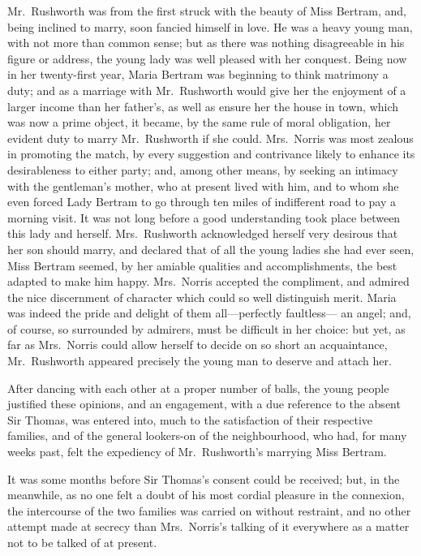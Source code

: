 Mr.\ Rushworth was from the first struck with the beauty
of Miss Bertram, and, being inclined to marry, soon fancied
himself in love.  He was a heavy young man, with not more
than common sense; but as there was nothing disagreeable
in his figure or address, the young lady was well pleased
with her conquest.  Being now in her twenty-first year,
Maria Bertram was beginning to think matrimony a duty;
and as a marriage with Mr.\ Rushworth would give her the
enjoyment of a larger income than her father's, as well as
ensure her the house in town, which was now a prime object,
it became, by the same rule of moral obligation,
her evident duty to marry Mr.\ Rushworth if she could.
Mrs.\ Norris was most zealous in promoting the match,
by every suggestion and contrivance likely to enhance
its desirableness to either party; and, among other means,
by seeking an intimacy with the gentleman's mother,
who at present lived with him, and to whom she even forced
Lady Bertram to go through ten miles of indifferent road
to pay a morning visit.  It was not long before a good
understanding took place between this lady and herself.
Mrs.\ Rushworth acknowledged herself very desirous that
her son should marry, and declared that of all the young
ladies she had ever seen, Miss Bertram seemed, by her
amiable qualities and accomplishments, the best adapted
to make him happy.  Mrs.\ Norris accepted the compliment,
and admired the nice discernment of character which
could so well distinguish merit.  Maria was indeed
the pride and delight of them all---perfectly faultless---%
an angel; and, of course, so surrounded by admirers, must be
difficult in her choice:  but yet, as far as Mrs.\ Norris
could allow herself to decide on so short an acquaintance,
Mr.\ Rushworth appeared precisely the young man to deserve
and attach her.

After dancing with each other at a proper number of balls,
the young people justified these opinions, and an engagement,
with a due reference to the absent Sir Thomas, was entered into,
much to the satisfaction of their respective families,
and of the general lookers-on of the neighbourhood,
who had, for many weeks past, felt the expediency
of Mr.\ Rushworth's marrying Miss Bertram.

It was some months before Sir Thomas's consent could
be received; but, in the meanwhile, as no one felt
a doubt of his most cordial pleasure in the connexion,
the intercourse of the two families was carried on
without restraint, and no other attempt made at secrecy
than Mrs.\ Norris's talking of it everywhere as a matter
not to be talked of at present.

